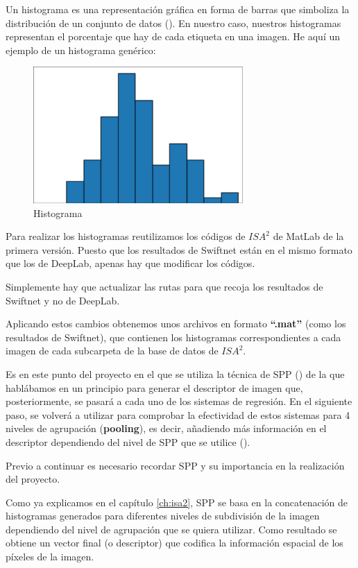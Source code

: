 Un histograma es una representación gráfica en forma de barras que simboliza la distribución de un conjunto de datos (\cite{histograma}). En nuestro caso, nuestros histogramas representan el porcentaje que hay de cada etiqueta en una imagen. He aquí un ejemplo de un histograma genérico:

\begin{figure}[H]
  \centering
  \includegraphics[width=8cm]{Figuras/histograma.eps}
  \caption{Histograma}
\end{figure}

Para realizar los histogramas reutilizamos los códigos de $ISA^{2}$ de MatLab de la primera versión. Puesto que los resultados de Swiftnet están en el mismo formato que los de DeepLab, apenas hay que modificar los códigos.

Simplemente hay que actualizar las rutas para que recoja los resultados de Swiftnet y no de DeepLab.

Aplicando estos cambios obtenemos unos archivos en formato \textbf{``.mat''} (como los resultados de Swiftnet), que contienen los histogramas correspondientes a cada imagen de cada subcarpeta de la base de datos de $ISA^{2}$.

Es en este punto del proyecto en el que se utiliza la técnica de \ac{SPP} (\cite{spp_real}) de la que hablábamos en un principio para generar el descriptor de imagen que, posteriormente, se pasará a cada uno de los sistemas de regresión. En el siguiente paso, se volverá a utilizar para comprobar la efectividad de estos sistemas para 4 niveles de agrupación (\textbf{pooling}), es decir, añadiendo más información en el descriptor dependiendo del nivel de \ac{SPP} que se utilice (\cite{isa2}).

Previo a continuar es necesario recordar \ac{SPP} y su importancia en la realización del proyecto.

Como ya explicamos en el capítulo \ref{ch:isa2}, \ac{SPP} se basa en la concatenación de histogramas generados para diferentes niveles de subdivisión de la imagen dependiendo del nivel de agrupación que se quiera utilizar. Como resultado se obtiene un vector final (o descriptor) que codifica la información espacial de los píxeles de la imagen.

